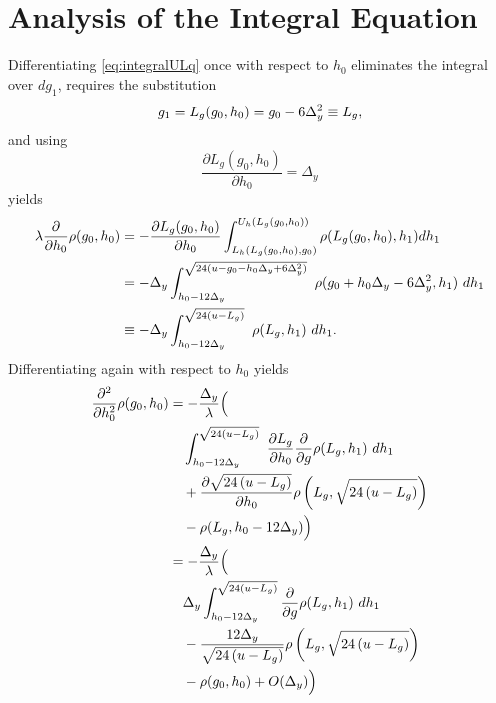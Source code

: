 \documentclass[twocolumn]{article}
\begin{document}
\onecolumn
\section{Analysis of the Integral Equation}
\label{sec:solve}

Differentiating
\eqref{eq:integralULq} once with respect to $h_0$ eliminates the
integral over $dg_1$, requires the substitution
\begin{equation*}
  g_1 = L_g(g_0,h_0) = g_0 - 6\Delta_y^2 \equiv L_g,
\end{equation*}
and using
\begin{equation*}
  \frac{\partial L_g(g_0,h_0)}{\partial h_0} = \Delta_y
\end{equation*}
yields
\begin{align*}
  \lambda \frac{\partial}{\partial h_0} \rho(g_0,h_0) &= -
  \frac{\partial L_g(g_0,h_0)}{\partial h_0} \int_{L_h(L_g(g_0,h_0),
    g_0)}^{U_h(L_g(g_0,h_0))} \rho(L_g(g_0,h_0),h_1) d h_1 \\
  & = -\Delta_y \int_{h_0 - 12\Delta_y}
  ^{\sqrt{24(u-g_0-h_0\Delta_y + 6\Delta_y^2)}}~ 
  \rho(g_0+h_0 \Delta_y -6 \Delta_y^2 , h_1) ~dh_1 \\
  & \equiv - \Delta_y \int_{h_0 - 12\Delta_y}
  ^{\sqrt{24\left(u-L_g\right)}}~ \rho(L_g , h_1) ~dh_1.
\end{align*}
Differentiating again with respect to $h_0$ yields
\begin{subequations}
  \label{eq:t}
\begin{align}
  \frac{\partial^2}{\partial h_0^2} \rho(g_0, h_0) &=
  -\frac{\Delta_y}{\lambda} \Bigl( \nonumber \\
  &\quad \int_{h_0 - 12 \Delta_y}^{\Rad{-L_g}}~ \frac{\partial L_g}{\partial h_0}
  \frac{\partial}{\partial g} \rho(L_g,h_1) ~dh_1 \nonumber \\
  &\quad + \frac{ \partial \Rad{-L_g}}{\partial h_0} \rho \left(L_g,
    \Rad{-L_g} \right) \nonumber \\
  &\quad - \rho(L_g, h_0 - 12\Delta_y ) \Bigr) \nonumber \\
%
  &= -\frac{\Delta_y}{\lambda} \Bigl( \nonumber \\
  \label{eq:t1}
  &\quad \Delta_y \int_{h_0 - 12 \Delta_y}^{\Rad{-L_g}}
  \frac{\partial}{\partial g} \rho(L_g,h_1) ~dh_1  \\
  \label{eq:t2}
  &\quad - \frac{12\Delta_y}{\Rad{-L_g}} \rho \left(L_g,
    \Rad{-L_g} \right) \\
  \label{eq:t3}
  &\quad - \rho(g_0, h_0) + O(\Delta_y) \Bigr)
\end{align}
\end{subequations}
\end{document}
